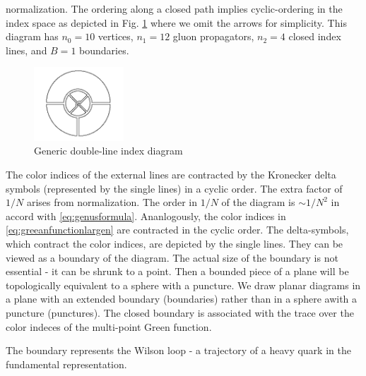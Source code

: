 normalization. The ordering along a closed path implies cyclic-ordering in the
index space as depicted in Fig. \ref{fig:genericdoubleline} where we omit the
arrows for simplicity. This diagram has $n_0=10$ vertices, $n_1=12$ gluon
propagators, $n_2=4$ closed index lines, and $B=1$ boundaries.
\begin{figure}[h]
\begin{center}
\includegraphics[width=0.3\textwidth]{Images/genericdoubleline.png}
\end{center}
\caption{Generic double-line index diagram}
\label{fig:genericdoubleline}
\end{figure}
The color indices of the external lines are contracted by the Kronecker delta
symbols (represented by the single lines) in a cyclic order. The extra factor
of $1/N$ arises from normalization. The order in $1/N$ of the diagram is $\sim
1/N^2$ in accord with \eqref{eq:genusformula}. Ananlogously, the color indices
in \eqref{eq:greeanfunctionlargen} are contracted in the cyclic order. The
delta-symbols, which contract the color indices, are depicted by the single
lines. They can be viewed as a boundary of the diagram. The actual size of
the boundary is not essential - it can be shrunk to a point. Then a bounded
piece of a plane will be topologically equivalent to a  sphere with a puncture.
We draw planar diagrams in a plane with an extended boundary (boundaries)
rather than in a sphere awith a  puncture (punctures). The closed boundary is
associated with the trace over the color indeces of the multi-point Green
function.
\par The boundary represents the Wilson loop - a trajectory of a heavy quark
in the fundamental representation.

